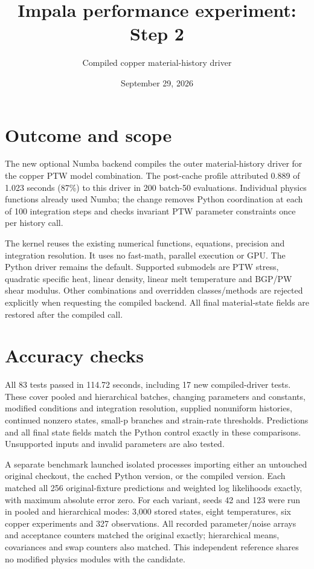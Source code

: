 \documentclass[11pt]{article}
\title{Impala performance experiment: Step 2}
\author{Compiled copper material-history driver}
\date{September 29, 2026}
\begin{document}
\maketitle
\section*{Outcome and scope}
The new optional Numba backend compiles the outer material-history driver for
the copper PTW model combination. The post-cache profile attributed 0.889 of
1.023 seconds (87\%) to this driver in 200 batch-50 evaluations. Individual
physics functions already used Numba; the change removes Python coordination
at each of 100 integration steps and checks invariant PTW parameter constraints
once per history call.

The kernel reuses the existing numerical functions, equations, precision and
integration resolution. It uses no fast-math, parallel execution or GPU. The
Python driver remains the default. Supported submodels are PTW stress,
quadratic specific heat, linear density, linear melt temperature and BGP/PW
shear modulus. Other combinations and overridden classes/methods are rejected
explicitly when requesting the compiled backend. All final material-state
fields are restored after the compiled call.
\section*{Accuracy checks}
All 83 tests passed in 114.72 seconds, including 17 new compiled-driver tests.
These cover pooled and hierarchical batches, changing parameters and constants,
modified conditions and integration resolution, supplied nonuniform histories,
continued nonzero states, small-p branches and strain-rate thresholds.
Predictions and all final state fields match the Python control exactly in
these comparisons. Unsupported inputs and invalid parameters are also tested.

A separate benchmark launched isolated processes importing either an untouched
original checkout, the cached Python version, or the compiled version. Each
matched all 256 original-fixture predictions and weighted log likelihoods
exactly, with maximum absolute error zero. For each variant, seeds 42 and 123
were run in pooled and hierarchical modes: 3,000 stored states, eight
temperatures, six copper experiments and 327 observations. All recorded
parameter/noise arrays and acceptance counters matched the original exactly;
hierarchical means, covariances and swap counters also matched. This independent
reference shares no modified physics modules with the candidate.
\end{document}
